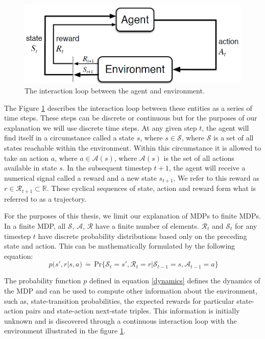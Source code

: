 \documentclass[a4paper,twoside,12pt]{report}
\begin{document}
\begin{figure}[ht]
	\centering
	\includegraphics[width=0.7\linewidth]{images/mdprl.png}
	\caption{The interaction loop between the agent and environment. \citep{sutton_barto_2018}}
	\label{fig:mdprl}
\end{figure}

The Figure \ref{fig:mdprl} describes the interaction loop between these entities as a series of time steps. These steps can be discrete or continuous but for the purposes of our explanation we will use discrete time steps. At any given step $t$, the agent will find itself in a circumstance called a state $s$, where $s \in \mathcal{S}$, where $\mathcal{S}$ is a set of all states reachable within the environment. Within this circumstance it is allowed to take an action $a$, where $a \in \mathcal{A}(s)$, where $\mathcal{A}(s)$ is the set of all actions available in state $s$. In the subsequent timestep $t+1$, the agent will receive a numerical signal called a reward and a new state $s_{t+1}$. We refer to this reward as $r \in \mathcal{R}_{t+1} \subset \mathbb{R}$. These cyclical sequences of state, action and reward form what is referred to as a trajectory. 

For the purposes of this thesis, we limit our explanation of MDPs to finite MDPs. In a finite MDP, all $\mathcal{S}$, $\mathcal{A}$, $\mathcal{R}$ have a finite number of elements. $\mathcal{R}_t$ and $\mathcal{S}_t$ for any timestep $t$ have discrete probability distributions based only on the preceding state and action. This can be mathematically formulated by the following equation: 
\begin{equation}
\ p(s', r|s, a) \, \dot{\mathbf{=}} \, \textrm{Pr}\{\mathcal{S}_t=s', \mathcal{R}_t=r | \mathcal{S}_{t-1}=s, \mathcal{A}_{t-1}=a\}
\label{dynamics}
\end{equation}

The probability function $p$ defined in equation \ref{dynamics} defines the dynamics of the MDP and can be used to compute other information about the environment, such as, state-transition probabilities, the expected rewards for particular state-action pairs and state-action next-state triples. This information is initially unknown and is discovered through a continuous interaction loop with the environment illustrated in the figure \ref{fig:mdprl}. 
\end{document}
